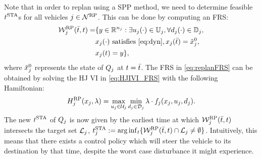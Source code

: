 Note that in order to replan using a SPP method, we need to determine feasible $t^\text{STA}$s for all vehicles $j \in \mathcal{N}^\text{RP}$. This can be done by computing an FRS:
\begin{equation} \label{eq:replanFRS}
\begin{aligned} 
\frs_j^{\text{RP}}(\tea, t) = & \{y \in \R^{n_j}: \exists \ctrl_j(\cdot) \in \cfset_j, \forall \dstb_j(\cdot) \in \dfset_j, \\
& \state_j(\cdot) \text{ satisfies \eqref{eq:dyn}}, \state_j(\tea) = \tilde{\state}_j^0, \\
& \state_j(t) = y\},
\end{aligned}
\end{equation}
where $\tilde{x}_j^0$ represents the state of $Q_j$ at $t = \bar{t}$. The FRS in \eqref{eq:replanFRS} can be obtained by solving the HJ VI in \eqref{eq:HJIVI_FRS} with the following Hamiltonian:
\begin{equation}
H_j^{\text{RP}}(x_j, \lambda) = \max_{u_j \in \mathcal{U}_j} \min_{d_j \in \mathcal{D}_j} \lambda \cdot f_j (x_j, u_j, d_j). 
\end{equation} 
The new $t^\text{STA}$ of $Q_j$ is now given by the earliest time at which $\mathcal{W}_j^{\text{RP}}(\bar{t}, t)$ intersects the target set $\mathcal{L}_j$, $t^\text{STA}_j := \arg \inf_t \{ \mathcal{W}_j^{\text{RP}}(\bar{t}, t) \cap \mathcal{L}_j \neq \emptyset \}$. Intuitively, this means that there exists a control policy which will steer the vehicle to its destination by that time, despite the worst case disturbance it might experience.


